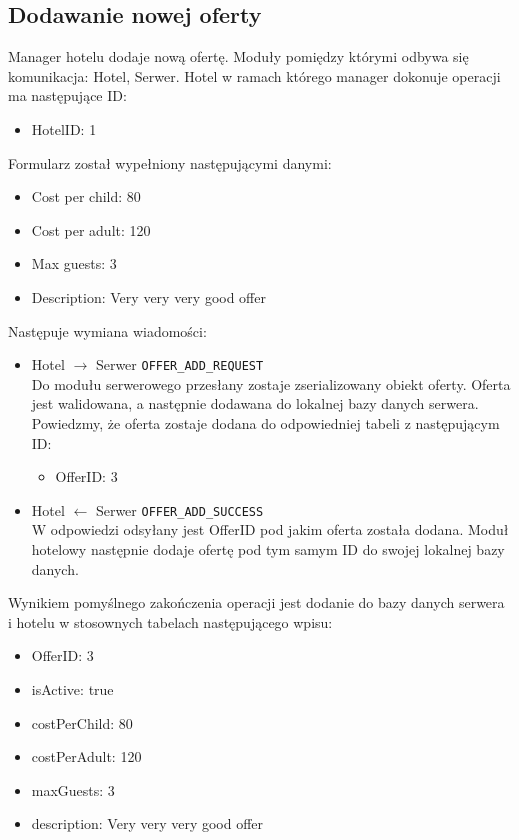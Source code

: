 \documentclass{article}
\begin{document}
\subsection{Dodawanie nowej oferty}
Manager hotelu dodaje nową ofertę. Moduły pomiędzy którymi odbywa się komunikacja: Hotel, Serwer. Hotel w ramach którego manager dokonuje operacji ma następujące ID:
\begin{itemize}
    \item HotelID: 1
\end{itemize}
Formularz został wypełniony następującymi danymi: 
\begin{itemize}
    \item Cost per child: 80
    \item Cost per adult: 120
    \item Max guests: 3
    \item Description: Very very very good offer 
\end{itemize}
Następuje wymiana wiadomości:
\begin{itemize}
    \item Hotel $\rightarrow$ Serwer \texttt{OFFER\_ADD\_REQUEST}\\ 
    Do modułu serwerowego przesłany zostaje zserializowany obiekt oferty. Oferta jest walidowana, a następnie dodawana do lokalnej bazy danych serwera. Powiedzmy, że oferta zostaje dodana do odpowiedniej tabeli z następującym ID:
    \begin{itemize}
        \item OfferID: 3
    \end{itemize}
    \item Hotel $\leftarrow$ Serwer \texttt{OFFER\_ADD\_SUCCESS}\\
    W odpowiedzi odsyłany jest OfferID pod jakim oferta została dodana. Moduł hotelowy następnie dodaje ofertę pod tym samym ID do swojej lokalnej bazy danych.
\end{itemize}
Wynikiem pomyślnego zakończenia operacji jest dodanie do bazy danych serwera i hotelu w stosownych tabelach następującego wpisu:
\begin{itemize}
    \item OfferID: 3
    \item isActive: true
    \item costPerChild: 80
    \item costPerAdult: 120
    \item maxGuests: 3
    \item description: Very very very good offer 
\end{itemize}
\end{document}

